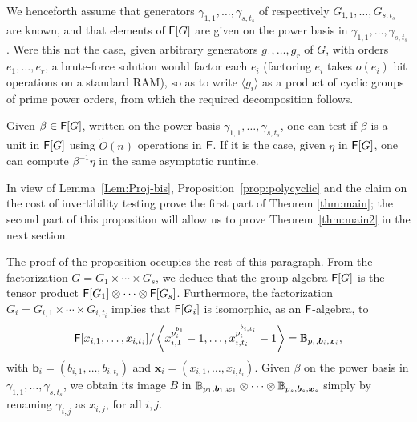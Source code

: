We henceforth assume that generators
$\gamma_{1,1},\dots,\gamma_{s,t_s}$ of respectively
$G_{1,1},\dots,G_{s,t_s}$ are known, and that elements of ${\mathsf{F}}[G]$ are
given on the power basis in $\gamma_{1,1},\dots,\gamma_{s,t_s}$. Were
this not the case, given arbitrary generators $g_1,\dots,g_r$ of $G$, with
orders $e_1,\dots,e_r$, a brute-force solution would factor each $e_i$
(factoring $e_i$ takes $o(e_i)$ bit operations on a standard RAM), so
as to write $\langle g_i \rangle$ as a product of cyclic groups of
prime power orders, from which the required decomposition follows.

\begin{proposition}
  Given $\beta \in {\mathsf{F}}[G]$, written on the power basis
  $\gamma_{1,1},\dots,\gamma_{s,t_s}$, one can test if $\beta$ is a
  unit in ${\mathsf{F}}[G]$ using $\tilde{O}(n)$ operations in ${\mathsf{F}}$.
  If it is the case, given $\eta$ in ${\mathsf{F}}[G]$, one can compute
  $\beta^{-1} \eta$ in the same asymptotic runtime.
\end{proposition}
In view of
Lemma~\ref{Lem:Proj-bis}, Proposition~\ref{prop:polycyclic} and the
claim on the cost of invertibility testing prove the first part of
Theorem \ref{thm:main}; the second part of this proposition will allow
us to prove Theorem~\ref{thm:main2} in the next section.

\smallskip

The proof of the proposition occupies the rest of this paragraph.
From the factorization $G = G_1 \times \cdots \times G_s$, we deduce
that the group algebra ${\mathsf{F}}[G]$ is the tensor product ${\mathsf{F}}[G_1] \otimes
\cdots \otimes {\mathsf{F}}[G_s]$. Furthermore, the factorization $G_i = G_{i,1}
\times \cdots \times G_{i,t_i}$ implies that ${\mathsf{F}}[G_i]$ is isomorphic,
as an ${\mathsf{F}}$-algebra, to
$${\mathsf{F}}[x_{i,1},\dots,x_{i,t_i}]/\left \langle
x_{i,1}^{p_i^{b_{1}}}-1,\dots,x_{i,t_i}^{p_i^{b_{i,t_i}}}-1\right\rangle
=\mathbb{B}_{p_i,\boldsymbol{b}_i,\boldsymbol{x}_i},$$ with $\boldsymbol{b}_i
= (b_{i,1},\dots,b_{i,t_i})$ and $\boldsymbol{x}_i =
(x_{i,1},\dots,x_{i,t_i})$. Given $\beta$ on the power basis in
$\gamma_{1,1},\dots,\gamma_{s,t_s}$, we obtain its image $B$ in
$\mathbb{B}_{p_1,\boldsymbol{b}_1,\boldsymbol{x}_1} \otimes \cdots \otimes
\mathbb{B}_{p_s,\boldsymbol{b}_s,\boldsymbol{x}_s}$ simply by renaming
$\gamma_{i,j}$ as $x_{i,j}$, for all $i,j$.

